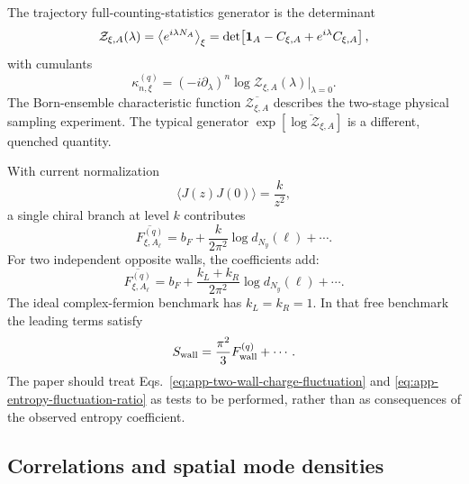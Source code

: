 The trajectory full-counting-statistics generator is the determinant
\begin{equation}
    \mathcal Z_{\xi,A}(\lambda)
    =\left\langle e^{i\lambda N_A}\right\rangle_\xi
    =\det\!\left[\mathbf{1}_A-C_{\xi,A}
      +e^{i\lambda}C_{\xi,A}\right],
    \label{eq:app-FCS-determinant}
\end{equation}
with cumulants
\begin{equation}
    \kappa_{n,\xi}^{(q)}
    =(-i\partial_\lambda)^n
      \log\mathcal Z_{\xi,A}(\lambda)\big|_{\lambda=0}.
    \label{eq:app-FCS-cumulants}
\end{equation}
The Born-ensemble characteristic function
\(\overline{\mathcal Z_{\xi,A}}\) describes the two-stage physical sampling
experiment.  The typical generator
\(\exp[\overline{\log\mathcal Z_{\xi,A}}]\) is a different, quenched
quantity.

With current normalization
\begin{equation}
    \langle J(z)J(0)\rangle=\frac{k}{z^2},
    \label{eq:app-KM-normalization}
\end{equation}
a single chiral branch at level \(k\) contributes
\begin{equation}
    \overline{F_{\xi,A_\ell}^{(q)}}
    =b_F+\frac{k}{2\pi^2}\log d_{N_y}(\ell)+\cdots .
    \label{eq:app-single-wall-charge-fluctuation}
\end{equation}
For two independent opposite walls, the coefficients add:
\begin{equation}
    \overline{F_{\xi,A_\ell}^{(q)}}
    =b_F+\frac{k_L+k_R}{2\pi^2}
      \log d_{N_y}(\ell)+\cdots .
    \label{eq:app-two-wall-charge-fluctuation}
\end{equation}
The ideal complex-fermion benchmark has \(k_L=k_R=1\).  In that free
benchmark the leading terms satisfy
\begin{equation}
    S_{\rm wall}=\frac{\pi^2}{3}F_{\rm wall}^{(q)}+\cdots .
    \label{eq:app-entropy-fluctuation-ratio}
\end{equation}
The paper should treat Eqs.~\eqref{eq:app-two-wall-charge-fluctuation} and
\eqref{eq:app-entropy-fluctuation-ratio} as tests to be performed, rather
than as consequences of the observed entropy coefficient.

\subsection{Correlations and spatial mode densities}

